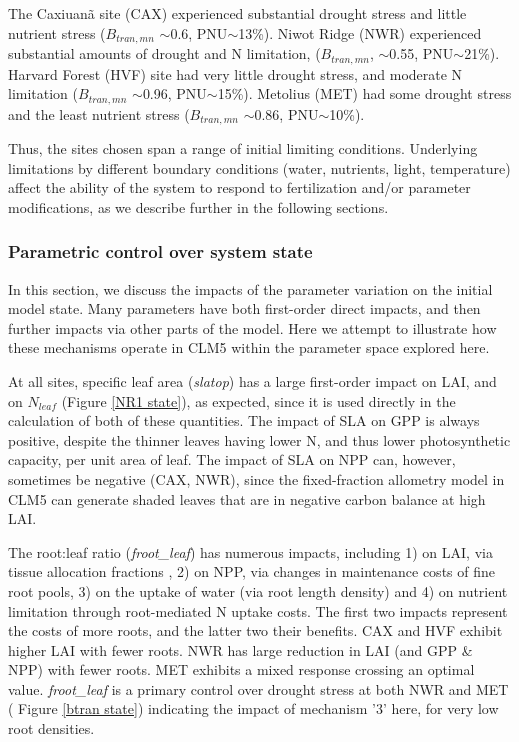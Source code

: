 \documentclass[draft,linenumbers]{agujournal}
\begin{document}
The Caxiuan\~a site (CAX) experienced substantial drought stress and little nutrient stress ($B_{tran,mn}$ $\sim$0.6, PNU$\sim$13\%). Niwot Ridge (NWR) experienced substantial amounts of drought and N limitation, ($B_{tran,mn}$, $\sim$0.55, PNU$\sim$21\%). Harvard Forest (HVF) site had very little drought stress, and moderate N limitation ($B_{tran,mn}$ $\sim$0.96, PNU$\sim$15\%).  Metolius (MET)  had some drought stress and the least nutrient stress ($B_{tran,mn}$ $\sim$0.86, PNU$\sim$10\%).  

Thus, the sites chosen span a range of initial limiting conditions. Underlying limitations by different boundary conditions (water, nutrients, light, temperature) affect the ability of the system to respond to fertilization and/or parameter modifications, as we describe further in the following sections. 

\subsubsection{Parametric control over system state}
In this section, we discuss the impacts of the parameter variation on the initial model state.  Many parameters have both first-order direct impacts, and then further impacts via other parts of the model. Here we attempt to illustrate how these mechanisms operate in CLM5 within the parameter space explored here. 

At all sites, specific leaf area (\emph{slatop}) has a large first-order impact on LAI, and on $N_{leaf}$ (Figure \ref{NR1 state}), as expected, since it is used directly in the calculation of both of these quantities. The impact of SLA on GPP is always positive, despite the thinner leaves having lower N, and thus lower photosynthetic capacity, per unit area of leaf. The impact of SLA on NPP can, however, sometimes be negative (CAX, NWR), since the fixed-fraction allometry model in CLM5 can generate shaded leaves that are in negative carbon balance at high LAI. 

The root:leaf ratio (\emph{froot\_leaf}) has numerous impacts, including 1) on LAI, via tissue allocation fractions , 2) on NPP, via changes in maintenance costs of fine root pools, 3) on the uptake of water (via root length density) and 4) on nutrient limitation through root-mediated N uptake costs. The first two impacts represent the costs of more roots, and the latter two their benefits. CAX and HVF exhibit higher LAI with fewer roots. NWR has large reduction in LAI (and GPP \& NPP) with fewer roots. MET exhibits a mixed response crossing an optimal value. \emph{froot\_leaf} is a primary control over drought stress at both NWR and MET ( Figure \ref{btran state}) indicating the impact of mechanism '3' here, for very low root densities.
\end{document}
